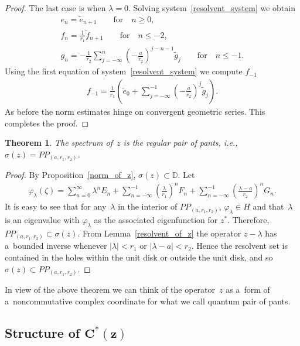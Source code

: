 \documentclass[11pt]{article}
\numberwithin{equation}{section}
\newtheorem{Theorem}{Theorem}[section]
\begin{document}
\begin{proof}
The last case is when $\lambda=0$.
Solving system~\eqref{resolvent_system} we obtain
\begin{gather*}
e_n =\tilde{e}_{n+1} \qquad\text{for}\quad n\ge0,
\\
f_n =\frac{1}{r_1}\tilde{f}_{n+1} \qquad\text{for}\quad n\le-2,
\\
g_n =-\frac{1}{r_2}\sum\limits_{j=-\infty}^n\left(-\frac{a}{r_2}\right)^{j-n-1}\tilde{g}_j \qquad\text{for}\quad n\le-1.
\end{gather*}
Using the f\/irst equation of system~\eqref{resolvent_system} we compute $f_{-1}$
\begin{gather*}
f_{-1}=\frac{1}{r_1}\left(\tilde{e}_0+\sum\limits_{j=-\infty}^{-1}\left(-\frac{a}{r_2}\right)^j\tilde{g}_j\right).
\end{gather*}
As before the norm estimates hinge on convergent geometric series.
This completes the proof.
\end{proof}

\begin{Theorem}%
The spectrum of~$z$ is the regular pair of pants, i.e., $\sigma(z)=PP_{(a, r_1,r_2)}$.
\end{Theorem}

\begin{proof}
By Proposition~\ref{norm_of_z}, $\sigma(z)\subset {\mathbb D}$.
Let
\begin{gather*}
\varphi_\lambda(\zeta)=\sum\limits_{n=0}^\infty \lambda^nE_n+\sum\limits_{n=-\infty}^{-1}
\left(\frac{\lambda}{r_1}\right)^nF_n+\sum\limits_{n=-\infty}^{-1}\left(\frac{\lambda-a}{r_2}\right)^nG_n.
\end{gather*}
It is easy to see that for any~$\lambda$ in the interior of $PP_{(a, r_1,r_2)}$, $\varphi_\lambda\in H$ and
that~$\lambda$ is an eigenvalue with $\varphi_\lambda$ as the associated eigenfunction for $z^*$.
Therefore, $PP_{(a, r_1,r_2)}\subset\sigma(z)$.
From Lemma~\ref{resolvent_of_z} the operator $z-\lambda$ has a~bounded inverse whenever $|\lambda|< r_1$ or $|\lambda-a|<r_2$.
Hence the resolvent set is contained in the holes within the unit disk or outside the unit disk, and so
$\sigma(z)\subset PP_{(a, r_1,r_2)}$.
\end{proof}

In view of the above theorem we can think of the operator~$z$ as a~form of a~noncommutative complex coordinate for what
we call quantum pair of pants.

\subsection[Structure of $C^*(z)$]{Structure of $\boldsymbol{C^*(z)}$}
\end{document}
